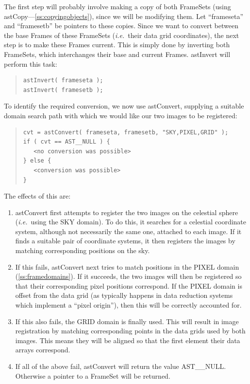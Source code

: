 \documentclass[twoside,11pt]{article}
\newcommand{\htmlref}[2]{#1}
\newcommand{\secref}[1]{\S\ref{#1}}
\renewcommand{\secref}[1]{\ref{#1}}
\begin{document}
The first step will probably involve making a copy of both FrameSets
(using \htmlref{astCopy}{astCopy}---\secref{ss:copyingobjects}), since we will be
modifying them. Let ``frameseta'' and ``framesetb'' be pointers to
these copies. Since we want to convert between the base Frames of
these FrameSets ({\em{i.e.}}\ their data grid coordinates), the next
step is to make these Frames current. This is simply done by inverting
both FrameSets, which interchanges their base and current
Frames. \htmlref{astInvert}{astInvert} will perform this task:

\begin{quote}
\small
\begin{verbatim}
astInvert( frameseta );
astInvert( framesetb );
\end{verbatim}
\normalsize
\end{quote}

To identify the required conversion, we now use \htmlref{astConvert}{astConvert}, supplying
a suitable domain search path with which we would like our two images
to be registered:

\begin{quote}
\small
\begin{verbatim}
cvt = astConvert( frameseta, framesetb, "SKY,PIXEL,GRID" );
if ( cvt == AST__NULL ) {
   <no conversion was possible>
} else {
   <conversion was possible>
}
\end{verbatim}
\normalsize
\end{quote}

The effects of this are:

\begin{enumerate}
\item astConvert first attempts to register the two images on the
celestial sphere ({\em{i.e.}}\ using the SKY domain). To do this, it
searches for a celestial coordinate system, although not necessarily
the same one, attached to each image.  If it finds a suitable pair of
coordinate systems, it then registers the images by matching
corresponding positions on the sky.

\item If this fails, astConvert next tries to match positions in the
PIXEL domain (\secref{ss:framedomains}). If it succeeds, the two
images will then be registered so that their corresponding pixel
positions correspond. If the PIXEL domain is offset from the data grid
(as typically happens in data reduction systems which implement a
``pixel origin''), then this will be correctly accounted for.

\item If this also fails, the GRID domain is finally used. This will
result in image registration by matching corresponding points in the
data grids used by both images. This means they will be
aligned so that the first element their data arrays correspond.

\item If all of the above fail, astConvert will return the value
AST\_\_NULL. Otherwise a pointer to a FrameSet will be returned.
\end{enumerate}
\end{document}
